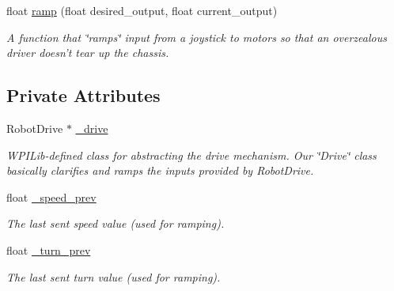 \begin{DoxyCompactItemize}
float \hyperlink{class_r_j_f_r_c2011_1_1_drive_a178331829dec3f3aca42663859624f48}{ramp} (float desired\_\-output, float current\_\-output)
\begin{DoxyCompactList}\small\item\em A function that \char`\"{}ramps\char`\"{} input from a joystick to motors so that an overzealous driver doesn't tear up the chassis. \item\end{DoxyCompactList}\end{DoxyCompactItemize}
\subsection*{Private Attributes}
\begin{DoxyCompactItemize}
\item 
\hypertarget{class_r_j_f_r_c2011_1_1_drive_a4e6fb332d2aed2f9cdd44abf19cb5d7e}{
RobotDrive $\ast$ \hyperlink{class_r_j_f_r_c2011_1_1_drive_a4e6fb332d2aed2f9cdd44abf19cb5d7e}{\_\-drive}}
\label{class_r_j_f_r_c2011_1_1_drive_a4e6fb332d2aed2f9cdd44abf19cb5d7e}

\begin{DoxyCompactList}\small\item\em WPILib-\/defined class for abstracting the drive mechanism. Our \char`\"{}Drive\char`\"{} class basically clarifies and ramps the inputs provided by RobotDrive. \item\end{DoxyCompactList}\item 
\hypertarget{class_r_j_f_r_c2011_1_1_drive_a00ef359ecfa695063e012fddaa848f50}{
float \hyperlink{class_r_j_f_r_c2011_1_1_drive_a00ef359ecfa695063e012fddaa848f50}{\_\-speed\_\-prev}}
\label{class_r_j_f_r_c2011_1_1_drive_a00ef359ecfa695063e012fddaa848f50}

\begin{DoxyCompactList}\small\item\em The last sent speed value (used for ramping). \item\end{DoxyCompactList}\item 
\hypertarget{class_r_j_f_r_c2011_1_1_drive_a28a4c1ce270c272f351abc966b557fe0}{
float \hyperlink{class_r_j_f_r_c2011_1_1_drive_a28a4c1ce270c272f351abc966b557fe0}{\_\-turn\_\-prev}}
\label{class_r_j_f_r_c2011_1_1_drive_a28a4c1ce270c272f351abc966b557fe0}

\begin{DoxyCompactList}\small\item\em The last sent turn value (used for ramping). \item\end{DoxyCompactList}\end{DoxyCompactItemize}


